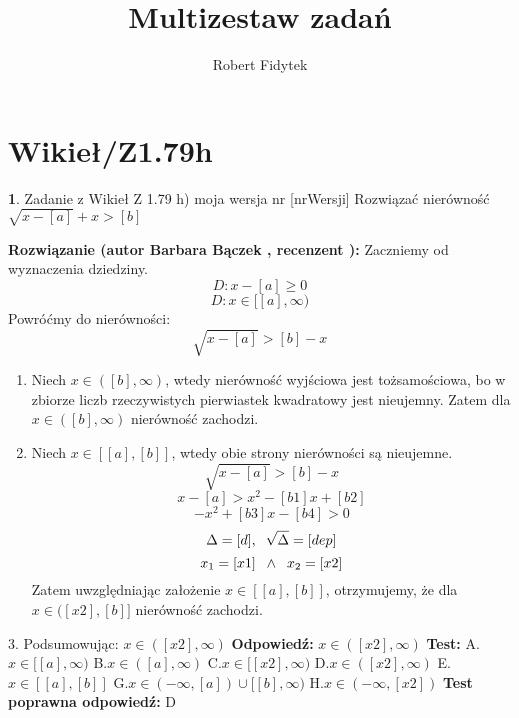 \documentclass[12pt, a4paper]{article}
\title{Multizestaw zadań}
\author{Robert Fidytek}
\date{}
\theoremstyle{definition} %
\newtheorem{zad}{}
\newcommand{\kategoria}[1]{\section{#1}} %
\newcommand{\zadStart}[1]{\begin{zad}#1\newline} %
\newcommand{\zadStop}{\end{zad}}   %
\newcommand{\rozwStart}[2]{\noindent \textbf{Rozwiązanie (autor #1 , recenzent #2): }\newline} %
\newcommand{\rozwStop}{\newline}                                            %
\newcommand{\odpStart}{\noindent \textbf{Odpowiedź:}\newline}    %
\newcommand{\odpStop}{\newline}                                             %
\newcommand{\testStart}{\noindent \textbf{Test:}\newline} %
\newcommand{\testStop}{\newline} %
\newcommand{\kluczStart}{\noindent \textbf{Test poprawna odpowiedź:}\newline} %
\newcommand{\kluczStop}{\newline} %
\begin{document}
\maketitle


\kategoria{Wikieł/Z1.79h}
\zadStart{Zadanie z Wikieł Z 1.79 h) moja wersja nr [nrWersji]}
Rozwiązać nierówność $\sqrt{x-[a]}+x>[b]$
\zadStop
\rozwStart{Barbara Bączek}{}
Zaczniemy od wyznaczenia dziedziny.
$$D:x - [a] \geq 0$$
$$D: x \in [[a], \infty)$$
Powróćmy do nierówności:
$$\sqrt{x-[a]}>[b]-x$$
\begin{enumerate}
\item Niech $x \in ([b], \infty)$, wtedy nierówność wyjściowa jest tożsamościowa, bo w zbiorze liczb rzeczywistych pierwiastek kwadratowy jest nieujemny. Zatem dla $x \in ([b], \infty)$ nierówność zachodzi.
\item  Niech $x \in [[a], [b]]$, wtedy obie strony nierówności są nieujemne.
$$\sqrt{x-[a]}>[b]-x$$
$$x-[a]>x^2 -[b1]x + [b2]$$
$$-x^2+ [b3]x -[b4]>0$$
$$\Delta= [d], \hspace{0.2 cm} \sqrt{\Delta}=[dep]$$
$$x_1= [x1] \hspace{0.2 cm} \wedge \hspace{0.2 cm} x_2=[x2]$$
Zatem uwzględniając założenie $x \in [[a], [b]]$, otrzymujemy, że dla $x \in ([x2],[b]]$ nierówność zachodzi.
\end{enumerate}
3. Podsumowując: $x \in ([x2], \infty)$
\rozwStop
\odpStart
$x \in ([x2], \infty)$
\odpStop
\testStart
A.$x \in [[a], \infty)$
B.$x \in ([a], \infty)$
C.$x \in [[x2], \infty)$
D.$x \in ([x2], \infty)$
E.$x \in [[a],[b]]$
G.$x \in (-\infty,[a]) \cup [[b], \infty)$
H.$x \in (-\infty, [x2])$
\testStop
\kluczStart
D
\kluczStop
\end{document}
